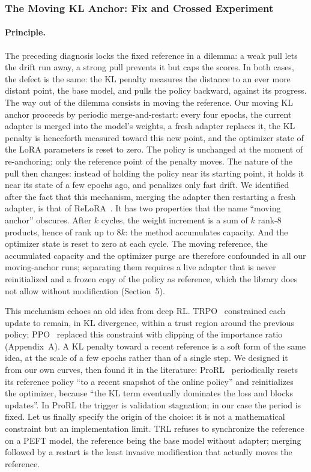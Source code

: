 \documentclass[11pt,a4paper]{article}
\begin{document}
\subsubsection{The Moving KL Anchor: Fix and Crossed Experiment}

\paragraph{Principle.} The preceding diagnosis locks the fixed reference in a dilemma: a weak pull lets the drift run away, a strong pull prevents it but caps the scores. In both cases, the defect is the same: the KL penalty measures the distance to an ever more distant point, the base model, and pulls the policy backward, against its progress. The way out of the dilemma consists in moving the reference. Our moving KL anchor proceeds by periodic merge-and-restart: every four epochs, the current adapter is merged into the model's weights, a fresh adapter replaces it, the KL penalty is henceforth measured toward this new point, and the optimizer state of the LoRA parameters is reset to zero. The policy is unchanged at the moment of re-anchoring; only the reference point of the penalty moves. The nature of the pull then changes: instead of holding the policy near its starting point, it holds it near its state of a few epochs ago, and penalizes only fast drift. We identified after the fact that this mechanism, merging the adapter then restarting a fresh adapter, is that of ReLoRA~\cite{lialin2023relora}. It has two properties that the name ``moving anchor'' obscures. After $k$ cycles, the weight increment is a sum of $k$ rank-8 products, hence of rank up to $8k$: the method accumulates capacity. And the optimizer state is reset to zero at each cycle. The moving reference, the accumulated capacity and the optimizer purge are therefore confounded in all our moving-anchor runs; separating them requires a live adapter that is never reinitialized and a frozen copy of the policy as reference, which the library does not allow without modification (Section~5).

This mechanism echoes an old idea from deep RL. TRPO~\cite{schulman2015trpo} constrained each update to remain, in KL divergence, within a trust region around the previous policy; PPO~\cite{schulman2017proximal} replaced this constraint with clipping of the importance ratio (Appendix~A). A KL penalty toward a recent reference is a soft form of the same idea, at the scale of a few epochs rather than of a single step. We designed it from our own curves, then found it in the literature: ProRL~\cite{liu2025prorl} periodically resets its reference policy ``to a recent snapshot of the online policy'' and reinitializes the optimizer, because ``the KL term eventually dominates the loss and blocks updates''. In ProRL the trigger is validation stagnation; in our case the period is fixed. Let us finally specify the origin of the choice: it is not a mathematical constraint but an implementation limit. TRL refuses to synchronize the reference on a PEFT model, the reference being the base model without adapter; merging followed by a restart is the least invasive modification that actually moves the reference.
\end{document}
